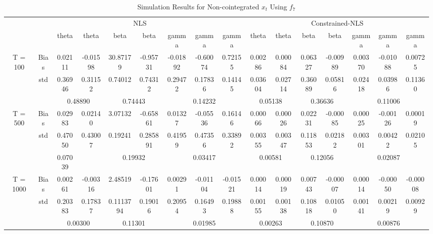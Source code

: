 \documentclass[a4paper,12pt,times,numbered,print,index]{report}
\numberwithin{equation}{section}
\begin{document}
\begin{table}[htbp]
	\centering
	\caption{Simulation Results for Non-cointegrated $x_t$ Using $f_7$}
	\begin{adjustbox}{max width=\textwidth}
	\begin{tabular}{cccccccccccccccc}
		\toprule
		& \multicolumn{8}{c}{NLS}                                       & \multicolumn{7}{c}{Constrained-NLS} \\
		&       & theta & theta & beta  & beta  & gamma & gamma & gamma & theta & theta & beta  & beta  & gamma & gamma & gamma \\
		\midrule
		\multirow{3}[1]{*}{T = 100} & Bias  & \textcolor[rgb]{ 0,  .439,  .753}{0.02111} & -0.01598 & 30.87179 & -0.95731 & -0.01892 & -0.60074 & 0.72155 & \textcolor[rgb]{ 0,  .439,  .753}{0.00286} & 0.00084 & 0.06327 & -0.00989 & 0.00370 & -0.01088 & 0.00725 \\
		& std   & 0.36946 & 0.31152 & 0.74012 & 0.74312 & 0.29472 & 0.17836 & 0.14145 & 0.03604 & 0.02714 & 0.36089 & 0.05816 & 0.02418 & 0.03986 & 0.11360 \\
		&       & \multicolumn{2}{c}{0.48890} & \multicolumn{2}{c}{0.74443} & \multicolumn{3}{c}{0.14232} & \multicolumn{2}{c}{0.05138} & \multicolumn{2}{c}{0.36636} & \multicolumn{3}{c}{0.11006} \\
		\multirow{3}[0]{*}{T = 500} & Bias  & \textcolor[rgb]{ 0,  .439,  .753}{0.02983} & 0.02140 & 3.07132 & -0.65861 & 0.01327 & -0.05536 & 0.16146 & \textcolor[rgb]{ 0,  .439,  .753}{0.00066} & 0.00026 & 0.02231 & -0.00085 & 0.00025 & -0.00126 & 0.00019 \\
		& std   & 0.47050 & 0.43007 & 0.19241 & 0.285891 & 0.41959 & 0.47356 & 0.33892 & 0.00355 & 0.00347 & 0.11853 & 0.02182 & 0.00301 & 0.00422 & 0.02105 \\
		&       & 0.07039 &       & \multicolumn{2}{c}{0.19932} & \multicolumn{3}{c}{0.03417} & \multicolumn{2}{c}{0.00581} & \multicolumn{2}{c}{0.12056} & \multicolumn{3}{c}{0.02087} \\
		\multirow{3}[1]{*}{T = 1000} & Bias  & \textcolor[rgb]{ 0,  .439,  .753}{0.00261} & -0.00316 & 2.48519 & -0.17601 & 0.00291 & -0.01104 & -0.01521 & \textcolor[rgb]{ 0,  .439,  .753}{0.00014} & 0.00019 & 0.00743 & -0.00007 & 0.00014 & -0.00050 & -0.00008 \\
		& std   & 0.20383 & 0.17837 & 0.1113794 & 0.19016 & 0.20954 & 0.16493 & 0.19888 & 0.00155 & 0.00138 & 0.10818 & 0.01050 & 0.00141 & 0.00219 & 0.00929 \\
		&       & \multicolumn{2}{c}{\textcolor[rgb]{ .329,  .51,  .208}{0.00300}} & \multicolumn{2}{c}{\textcolor[rgb]{ .329,  .51,  .208}{0.11301}} & \multicolumn{3}{c}{\textcolor[rgb]{ .329,  .51,  .208}{0.01985}} & \multicolumn{2}{c}{\textcolor[rgb]{ .329,  .51,  .208}{0.00263}} & \multicolumn{2}{c}{\textcolor[rgb]{ .329,  .51,  .208}{0.10870}} & \multicolumn{3}{c}{\textcolor[rgb]{ .329,  .51,  .208}{0.00876}} \\
		\bottomrule
		\bottomrule
    	\end{tabular}%
	\end{adjustbox}
\label{nonco-f7}%
\end{table}%
\end{document}
